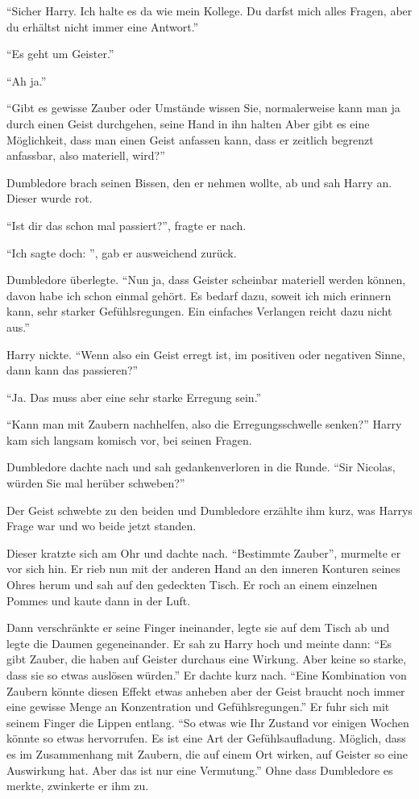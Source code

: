\enquote{Sicher Harry. Ich halte es da wie mein Kollege. Du darfst mich alles Fragen, aber du erhältst nicht immer eine Antwort.}

\enquote{Es geht um Geister.}

\enquote{Ah ja.}

\enquote{Gibt es gewisse Zauber \gst oder Umstände \gst wissen Sie, normalerweise kann man ja durch einen Geist durchgehen, seine Hand in ihn halten \gst Aber gibt es eine Möglichkeit, dass man einen Geist anfassen kann, dass er zeitlich begrenzt anfassbar, also materiell, wird?}

Dumbledore brach seinen Bissen, den er nehmen wollte, ab und sah Harry an. Dieser wurde rot.

\enquote{Ist dir das schon mal passiert?}, fragte er nach.

\enquote{Ich sagte doch: }, gab er ausweichend zurück.

Dumbledore überlegte. \enquote{Nun ja, dass Geister scheinbar materiell werden können, davon habe ich schon einmal gehört. Es bedarf dazu, soweit ich mich erinnern kann, sehr starker Gefühlsregungen. Ein einfaches Verlangen reicht dazu nicht aus.}

Harry nickte. \enquote{Wenn also ein Geist erregt ist, im positiven oder negativen Sinne, dann kann das passieren?}

\enquote{Ja. Das muss aber eine sehr starke Erregung sein.}

\enquote{Kann man mit Zaubern nachhelfen, also die Erregungsschwelle senken?} Harry kam sich langsam komisch vor, bei seinen Fragen.

Dumbledore dachte nach und sah gedankenverloren in die Runde. \enquote{Sir Nicolas, würden Sie mal herüber schweben?}

Der Geist schwebte zu den beiden und Dumbledore erzählte ihm kurz, was Harrys Frage war und wo beide jetzt standen.

Dieser kratzte sich am Ohr und dachte nach. \enquote{Bestimmte Zauber\abs}, murmelte er vor sich hin. Er rieb nun mit der anderen Hand an den inneren Konturen seines Ohres herum und sah auf den gedeckten Tisch. Er roch an einem einzelnen Pommes und kaute dann in der Luft.

Dann verschränkte er seine Finger ineinander, legte sie auf dem Tisch ab und legte die Daumen gegeneinander. Er sah zu Harry hoch und meinte dann: \enquote{Es gibt Zauber, die haben auf Geister durchaus eine Wirkung. Aber keine so starke, dass sie so etwas auslösen würden.} Er dachte kurz nach. \enquote{Eine Kombination von Zaubern könnte diesen Effekt etwas anheben \gst aber der Geist braucht noch immer eine gewisse Menge an Konzentration und Gefühlsregungen.} Er fuhr sich mit seinem Finger die Lippen entlang. \enquote{So etwas wie Ihr Zustand vor einigen Wochen könnte so etwas hervorrufen. Es ist eine Art der Gefühlsaufladung. Möglich, dass es im Zusammenhang mit Zaubern, die auf einem Ort wirken, auf Geister so eine Auswirkung hat. \gst Aber das ist nur eine Vermutung.} Ohne dass Dumbledore es merkte, zwinkerte er ihm zu.

